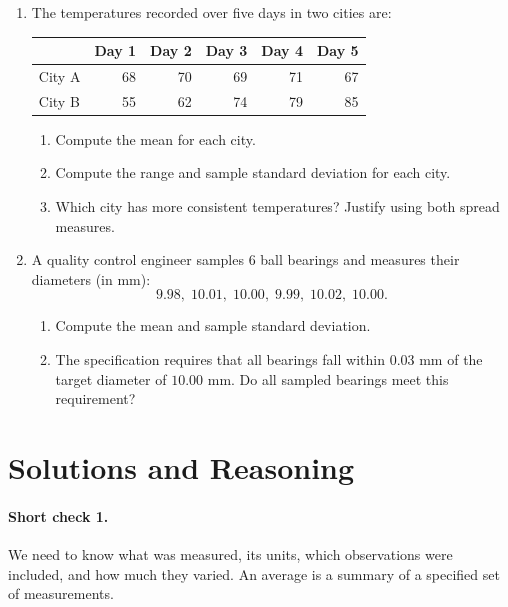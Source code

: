 \begin{enumerate}[label=R\arabic*.,leftmargin=2.5em,itemsep=10pt]
  \item The temperatures recorded over five days in two
    cities are:
    \begin{center}
    \renewcommand{\arraystretch}{1.4}
    \begin{tabular}{lrrrrr}
    \toprule
    & Day 1 & Day 2 & Day 3 & Day 4 & Day 5 \\
    \midrule
    City A & 68 & 70 & 69 & 71 & 67 \\
    City B & 55 & 62 & 74 & 79 & 85 \\
    \bottomrule
    \end{tabular}
    \end{center}
    \begin{enumerate}[label=(\alph*), itemsep=4pt]
      \item Compute the mean for each city.
      \item Compute the range and sample standard deviation
        for each city.
      \item Which city has more consistent temperatures?
        Justify using both spread measures.
    \end{enumerate}

  \item A quality control engineer samples 6 ball bearings
    and measures their diameters (in mm):
    \[ 9.98,\; 10.01,\; 10.00,\; 9.99,\; 10.02,\; 10.00. \]
    \begin{enumerate}[label=(\alph*), itemsep=4pt]
      \item Compute the mean and sample standard deviation.
      \item The specification requires that all bearings
        fall within $0.03$ mm of the target diameter of
        $10.00$ mm. Do all sampled bearings meet this
        requirement?
    \end{enumerate}

\end{enumerate}

\clearpage
\section*{Solutions and Reasoning}

\paragraph{Short check 1.}
We need to know what was measured, its units, which observations were included, and how much they varied. An average is a summary of a specified set of measurements.


